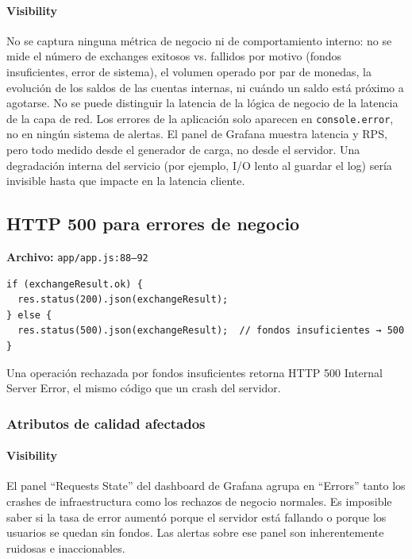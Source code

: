 \paragraph{Visibility}
No se captura ninguna métrica de negocio ni de comportamiento interno: no se mide el número de exchanges exitosos vs. fallidos por motivo (fondos insuficientes, error de sistema), el volumen operado por par de monedas, la evolución de los saldos de las cuentas internas, ni cuándo un saldo está próximo a agotarse. No se puede distinguir la latencia de la lógica de negocio de la latencia de la capa de red. Los errores de la aplicación solo aparecen en \texttt{console.error}, no en ningún sistema de alertas. El panel de Grafana muestra latencia y RPS, pero todo medido desde el generador de carga, no desde el servidor. Una degradación interna del servicio (por ejemplo, I/O lento al guardar el log) sería invisible hasta que impacte en la latencia cliente.

\subsection{HTTP 500 para errores de negocio}

\textbf{Archivo:} \texttt{app/app.js:88–92}

\begin{verbatim}
if (exchangeResult.ok) {
  res.status(200).json(exchangeResult);
} else {
  res.status(500).json(exchangeResult);  // fondos insuficientes → 500
}
\end{verbatim}

Una operación rechazada por fondos insuficientes retorna HTTP 500 Internal Server Error, el mismo código que un crash del servidor.

\subsubsection{Atributos de calidad afectados}

\paragraph{Visibility}
El panel ``Requests State'' del dashboard de Grafana agrupa en ``Errors'' tanto los crashes de infraestructura como los rechazos de negocio normales. Es imposible saber si la tasa de error aumentó porque el servidor está fallando o porque los usuarios se quedan sin fondos. Las alertas sobre ese panel son inherentemente ruidosas e inaccionables.

